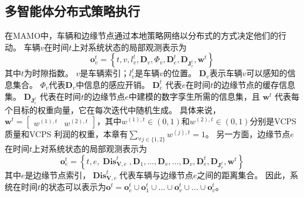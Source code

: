 \subsection{多智能体分布式策略执行}

在MAMO中，车辆和边缘节点通过本地策略网络以分布式的方式决定他们的行动。
车辆$v$在时间$t$上对系统状态的局部观测表示为 
	\begin{equation}
		\boldsymbol{o}_{v}^{t}=\left\{t, v, l_{v}^t, \mathbf{D}_{v}, \Phi_{v}, \mathbf{D}_{e}^{t}, \mathbf{D}_{\mathbf{J}_e^t}, \boldsymbol{w}^{t}\right\}
	\end{equation} 
\noindent 其中$t$为时隙指数。
$v$是车辆索引；$l_{v}^t$是车辆$v$的位置。
$\mathbf{D}_{v}$表示车辆$v$可以感知的信息集合。
$\Phi_{v}$代表$\mathbf{D}_{v}$中信息的感应开销。
$\mathbf{D}_{e}^{t}$ 代表$e$在时间$t$的边缘节点的缓存信息集。
$\mathbf{D}_{\mathbf{J}_e^t}$ 代表在时间$t$的边缘节点$e$中建模的数字孪生所需的信息集，且 $\boldsymbol{w}^{t}$ 代表每个目标的权重向量，它在每次迭代中随机生成。
具体来说，$\boldsymbol{w}^{t} = \begin{bmatrix}  w^{(1), t}  &  w^{(2), t} \end{bmatrix}$，其中$w^{(1), t} \in (0, 1)$和$w^{(2), t} \in (0, 1)$分别是VCPS质量和VCPS 利润的权重，本章有$\sum_{\forall j \in \{1, 2\}} w^{(j), t} = 1$。
另一方面，边缘节点$e$在时间$t$上对系统状态的局部观测表示为
\begin{equation}
	\boldsymbol{o}_{e}^{t}=\left\{t, e, \operatorname{\mathbf{Dis}}_{\mathbf{V}, e}^{t}, \mathbf{D}_{1}, \ldots, \mathbf{D}_{v}, \ldots, \mathbf{D}_{v}, \mathbf{D}_{e}^{t}, \mathbf{D}_{\mathbf{J}_e^t}, \boldsymbol{w}^{t} \right\}
\end{equation}
\noindent 其中$e$是边缘节点索引，$\operatorname{\mathbf{Dis}}_{\mathbf{V}, e}^{t}$代表车辆与边缘节点$e$之间的距离集合。
因此，系统在时间$t$的状态可以表示为$\boldsymbol{o}^{t}=\boldsymbol{o}_{e}^{t} \cup \boldsymbol{o}_{1}^{t} \cup \ldots \cup \boldsymbol{o}_{v}^{t} \cup \ldots \cup \boldsymbol{o}_{v}^{t}$。

